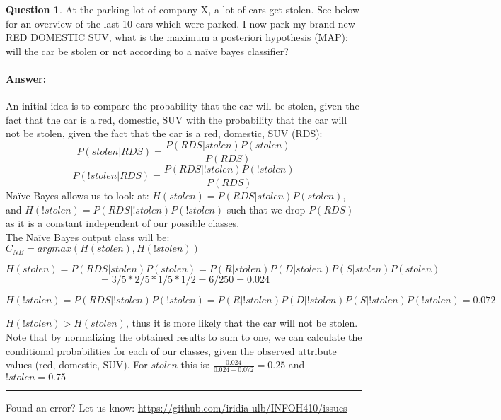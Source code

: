 \documentclass[11pt,a4paper]{article}
\theoremstyle{definition}%
\newtheorem{Q}{Question}[] %
\newcommand{\reponse}[1]{%
\ifthenelse {\boolean{corrige}} {\paragraph{Answer:} \color{darkblue}   #1\color{black}} {}
}
\begin{document}
\begin{Q}
    At the parking lot of company X, a lot of cars get stolen. See below for an overview of the last 10
cars which were parked. I now park my brand new RED DOMESTIC SUV, what is the maximum
a posteriori hypothesis (MAP): will the car be stolen or not according to a na\"ive bayes classifier?
\reponse{
    An initial idea is to compare the probability that the car will be stolen, given the fact
that the car is a red, domestic, SUV with the probability that the car will not be stolen, given the
fact that the car is a red, domestic, SUV (RDS):
$$P(stolen|RDS) = \frac{P(RDS|stolen) P(stolen)}{P(RDS)}$$
$$P(!stolen|RDS) = \frac{P(RDS|!stolen) P(!stolen)}{P(RDS)}$$
Naïve Bayes allows us to look at:
$H(stolen) = P(RDS|stolen)P(stolen)$, and
$H(!stolen) = P(RDS|!stolen)P(!stolen)$ such that we drop $P(RDS)$ as it is a constant independent
of our possible classes.\\
The Naïve Bayes output class will be:
$C_{NB} = argmax(H(stolen),H(!stolen))$

$$ H(stolen) = P(RDS|stolen) P(stolen) = P(R|stolen) P(D|stolen) P(S|stolen) P(stolen)$$
$$= 3/5 * 2/5 * 1/5 * 1/2 = 6/250 = 0.024 $$ 

$$ H(!stolen) = P(RDS|!stolen) P(!stolen) = P(R|!stolen) P(D|!stolen) P(S|!stolen) P(!stolen) = 0.072$$

$H(!stolen) > H(stolen)$, thus it is more likely that the car will not be stolen.
Note that by normalizing the obtained results to sum to one, we can calculate the conditional
probabilities for each of our classes, given the observed attribute values (red, domestic, SUV).
For $stolen$ this is: $\frac{0.024}{0.024+0.072} = 0.25$ and $!stolen = 0.75$
}
\end{Q}


\noindent
\rule{\textwidth}{0.4pt}
\footnotesize{Found an error? Let us know: \url{https://github.com/iridia-ulb/INFOH410/issues}}
\end{document}
